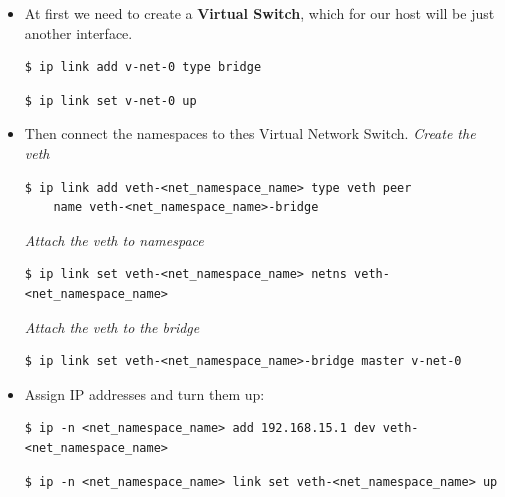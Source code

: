 \documentclass{article}
\newenvironment{codetemplate}[1][]{%
  \mybasecolorbox[#1]
  \itshape
}{%
  \endmybasecolorbox
}
\begin{document}
\begin{itemize}
    \item At first we need to create a \textbf{Virtual Switch}, which for our host will be just another interface.
\begin{codetemplate}{}
\begin{verbatim}
$ ip link add v-net-0 type bridge
\end{verbatim}
\end{codetemplate}
\begin{codetemplate}{}
\begin{verbatim}
$ ip link set v-net-0 up
\end{verbatim}
\end{codetemplate}
    \item Then connect the namespaces to thes Virtual Network Switch.
\begin{codetemplate}{Create the veth}
\begin{verbatim}
$ ip link add veth-<net_namespace_name> type veth peer 
    name veth-<net_namespace_name>-bridge
\end{verbatim}
\end{codetemplate}
\begin{codetemplate}{Attach the veth to namespace}
\begin{verbatim}
$ ip link set veth-<net_namespace_name> netns veth-<net_namespace_name>
\end{verbatim}
\end{codetemplate}
\begin{codetemplate}{Attach the veth to the bridge}
\begin{verbatim}
$ ip link set veth-<net_namespace_name>-bridge master v-net-0
\end{verbatim}
\end{codetemplate}
    \item Assign IP addresses and turn them up:
\begin{codetemplate}{}
\begin{verbatim}
$ ip -n <net_namespace_name> add 192.168.15.1 dev veth-<net_namespace_name>
\end{verbatim}
\end{codetemplate}
\begin{codetemplate}{}
\begin{verbatim}
$ ip -n <net_namespace_name> link set veth-<net_namespace_name> up
\end{verbatim}
\end{codetemplate}
\end{itemize}
\end{document}
